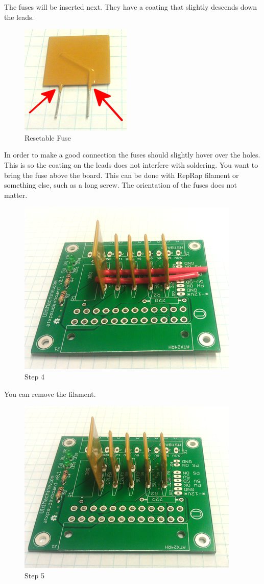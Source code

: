 The fuses will be inserted next. They have a coating that slightly
descends down the leads.

\begin{figure}[htbp]
\centering
\includegraphics{./png/fuse.png}
\caption{Resetable Fuse}
\end{figure}

In order to make a good connection the fuses should slightly hover over
the holes. This is so the coating on the leads does not interfere with
soldering. You want to bring the fuse above the board. This can be done
with RepRap filament or something else, such as a long screw. The
orientation of the fuses does not matter.

\begin{figure}[htbp]
\centering
\includegraphics{./png/step-04.png}
\caption{Step 4}
\end{figure}

You can remove the filament.

\begin{figure}[htbp]
\centering
\includegraphics{./png/step-05.png}
\caption{Step 5}
\end{figure}

